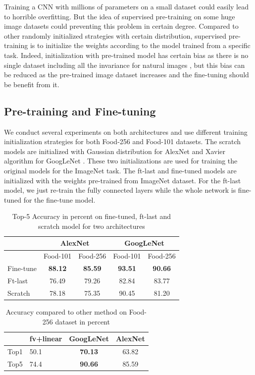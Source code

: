 Training a CNN with millions of parameters on a small dataset could easily lead to horrible overfitting. But the idea of supervised pre-training on some huge image datasets could preventing this problem in certain degree. Compared to other randomly initialized strategies with certain distribution, supervised pre-training is to initialize the weights according to the model trained from a specific task. Indeed, initialization with pre-trained model has certain bias as there is no single dataset including all the invariance for natural images \cite{agrawal2014analyzing}, but this bias can be reduced as the pre-trained image dataset increases and the fine-tuning should be benefit from it.
\subsection{Pre-training and Fine-tuning}
We conduct several experiments on both architectures and use different training initialization strategies for both Food-256 and Food-101 datasets. The scratch models are initialized with Gaussian distribution for AlexNet and Xavier algorithm for GoogLeNet%
 \cite{glorot2010understanding}. These two initializations are used for training the original models for the ImageNet task. The ft-last and fine-tuned models are initialized with the weights pre-trained from ImageNet dataset. For the ft-last model, we just re-train the fully connected layers while the whole network is fine-tuned for the fine-tune model.
\begin{table}[htbp]
  \centering
  \caption{Top-5 Accuracy in percent on fine-tuned, ft-last and scratch model for two architectures}
    \begin{tabular}{|l|cc|cc|}
    \hline
          & \multicolumn{2}{c|}{AlexNet} & \multicolumn{2}{c|}{GoogLeNet} \\  \hline 
     & Food-101   & Food-256   & Food-101   & Food-256 \\\hline
    Fine-tune & \textbf{88.12} & \textbf{85.59} & \textbf{93.51} & \textbf{90.66} \\\hline
    Ft-last &76.49	&79.26&	82.84	&83.77\\\hline
    Scratch & 78.18 & 75.35 & 90.45 & 81.20 \\\hline
    \end{tabular}%
  \label{tab:ft}%
\end{table}%


\begin{table}[htbp]
  \centering
  \caption{Accuracy compared to other method on Food-256 dataset in percent}
    \begin{tabular}{|c|C{3cm}|c|c|}
    \hline
     & fv+linear \cite{Kawano:2014} & GoogLeNet & AlexNet \\\hline
     
    Top1  & 50.1& \textbf{70.13} & 63.82 \\\hline
    Top5  & 74.4  & \textbf{90.66} & 85.59\\\hline
    \end{tabular}%
  \label{tab:256}%
\end{table}%

